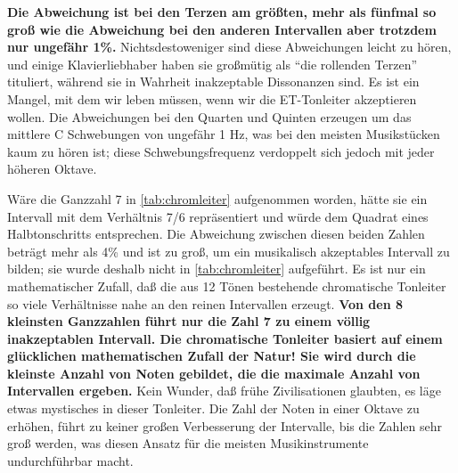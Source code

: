 \textbf{Die Abweichung ist bei den Terzen am größten, mehr als fünfmal so groß wie die Abweichung bei den anderen Intervallen aber trotzdem nur ungefähr 1\%.}
Nichtsdestoweniger sind diese Abweichungen leicht zu hören, und einige Klavierliebhaber haben sie großmütig als \enquote{die rollenden Terzen} tituliert, während sie in Wahrheit inakzeptable Dissonanzen sind.
Es ist ein Mangel, mit dem wir leben müssen, wenn wir die ET-Tonleiter akzeptieren wollen.
Die Abweichungen bei den Quarten und Quinten erzeugen um das mittlere C Schwebungen von ungefähr 1 Hz, was bei den meisten Musikstücken kaum zu hören ist; diese Schwebungsfrequenz verdoppelt sich jedoch mit jeder höheren Oktave.

Wäre die Ganzzahl 7 in \autoref{tab:chromleiter} aufgenommen worden, hätte sie ein Intervall mit dem Verhältnis 7/6 repräsentiert und würde dem Quadrat eines Halbtonschritts entsprechen.
Die Abweichung zwischen diesen beiden Zahlen beträgt mehr als 4\% und ist zu groß, um ein musikalisch akzeptables Intervall zu bilden; sie wurde deshalb nicht in \autoref{tab:chromleiter} aufgeführt.
Es ist nur ein mathematischer Zufall, daß die aus 12 Tönen bestehende chromatische Tonleiter so viele Verhältnisse nahe an den reinen Intervallen erzeugt.
\textbf{Von den 8 kleinsten Ganzzahlen führt nur die Zahl 7 zu einem völlig inakzeptablen Intervall.
Die chromatische Tonleiter basiert auf einem glücklichen mathematischen Zufall der Natur!
Sie wird durch die kleinste Anzahl von Noten gebildet, die die maximale Anzahl von Intervallen ergeben.}
Kein Wunder, daß frühe Zivilisationen glaubten, es läge etwas mystisches in dieser Tonleiter.
Die Zahl der Noten in einer Oktave zu erhöhen, führt zu keiner großen Verbesserung der Intervalle, bis die Zahlen sehr groß werden, was diesen Ansatz für die meisten Musikinstrumente undurchführbar macht.

